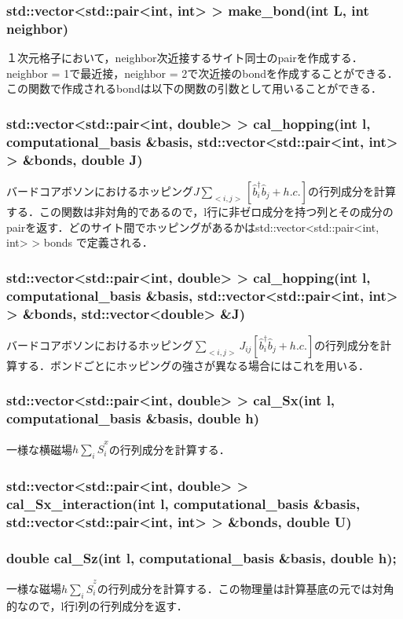 \documentclass[report, 11pt, uplatex]{jsbook}
\newcommand{\ani}[2]{\hat{{#1}}_{#2}}
\newcommand{\cre}[2]{\hat{{#1}}_{#2}^{\dagger}}
\newcommand{\sbr}[1]{\left[#1\right]}
\begin{document}
	\subsubsection*{std::vector<std::pair<int, int> > make\_bond(int L, int neighbor)}
	１次元格子において，neighbor次近接するサイト同士のpairを作成する．neighbor = 1で最近接，neighbor = 2で次近接のbondを作成することができる．この関数で作成されるbondは以下の関数の引数として用いることができる．

	\subsubsection*{std::vector<std::pair<int, double> > cal\_hopping(int l, computational\_basis \&basis, std::vector<std::pair<int, int> > \&bonds, double J)}
	バードコアボソンにおけるホッピング$J\sum_{<i,j>}\sbr{\cre{b}{i}\ani{b}{j}+h.c.}$の行列成分を計算する．この関数は非対角的であるので，l行に非ゼロ成分を持つ列とその成分のpairを返す．どのサイト間でホッピングがあるかはstd::vector<std::pair<int, int> > bonds で定義される．
	
	\subsubsection*{std::vector<std::pair<int, double> > cal\_hopping(int l, computational\_basis \&basis, std::vector<std::pair<int, int> > \&bonds, std::vector<double> \&J)}
	バードコアボソンにおけるホッピング$\sum_{<i,j>}J_{ij}\sbr{\cre{b}{i}\ani{b}{j}+h.c.}$の行列成分を計算する．ボンドごとにホッピングの強さが異なる場合にはこれを用いる．
	
	\subsubsection*{std::vector<std::pair<int, double> > cal\_Sx(int l, computational\_basis \&basis, double h)}
	一様な横磁場$h\sum_i\hat{S}^{x}_i$の行列成分を計算する．
	
	\subsubsection*{std::vector<std::pair<int, double> > cal\_Sx\_interaction(int l, computational\_basis \&basis, std::vector<std::pair<int, int> > \&bonds, double U)}
	
	\subsubsection*{double cal\_Sz(int l, computational\_basis \&basis, double h);}
	一様な磁場$h\sum_i\hat{S}^{z}_i$の行列成分を計算する．この物理量は計算基底の元では対角的なので，l行l列の行列成分を返す．
	
\end{document}
